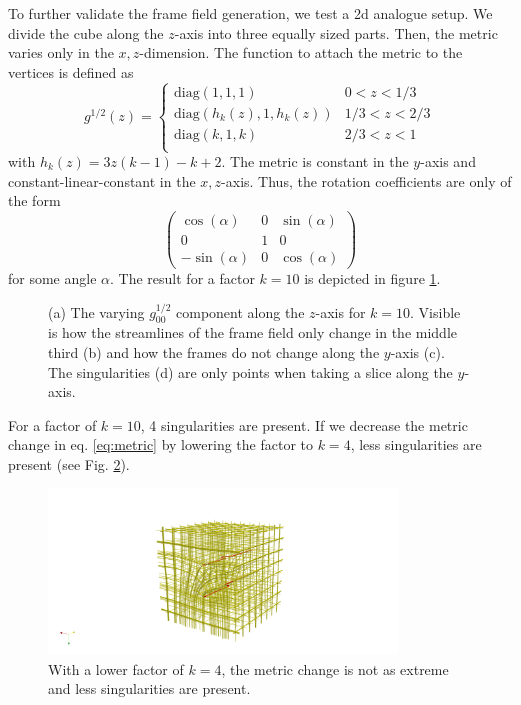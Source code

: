 \documentclass[../thesis.tex]{subfiles}
\begin{document}
To further validate the frame field generation, we test a 2d analogue setup.
We divide the cube along
the $z$-axis into three equally sized parts.
Then, the metric varies only in the $x,z$-dimension.
The function to attach the metric to the vertices is defined as
\begin{equation}
g^{1/2}(z) = \begin{cases}
    \mathrm{diag}(1,1,1) &0 < z < 1/3 \\
    \mathrm{diag}(h_k(z),1,h_k(z)) &1/3 < z < 2/3 \\
    \mathrm{diag}(k,1,k) &2/3 < z < 1 \\
\end{cases}\end{equation}\label{eq:metric}
with $h_k(z)=3z(k-1)-k+2$.
The metric is constant in the $y$-axis and constant-linear-constant in the $x,z$-axis.
Thus, the rotation coefficients are only of the form
$$\begin{pmatrix}
    \cos (\alpha) & 0 & \sin(\alpha) \\
    0 & 1 & 0 \\
    -\sin(\alpha) & 0 & \cos(\alpha)
\end{pmatrix}$$
for some angle $\alpha$.
The result for a factor $k=10$ is depicted in figure \ref{fig:image2}.
\begin{figure}[htb]
    \centering
    \def\svgwidth{\textwidth}
    
    \caption{(a) The varying $g^{1/2}_{00}$ component along the $z$-axis for $k=10$. Visible is how
    the streamlines of the frame field only change in the middle third (b) and how the frames do not change along the $y$-axis (c).
    The singularities (d) are only points when taking a slice along the $y$-axis.}
    \label{fig:image2}
\end{figure}
For a factor of $k=10$, 4 singularities are present.
If we decrease the metric change in eq. \ref{eq:metric} by
lowering the factor to $k=4$, less singularities are present (see Fig. \ref{fig:image3}).
\begin{figure}[htb]
    \centering
    \includegraphics[width=25em]{figures/image3}
    \caption{With a lower factor of $k=4$, the metric change is not as extreme and less singularities are present.}
    \label{fig:image3}
\end{figure}
\end{document}
